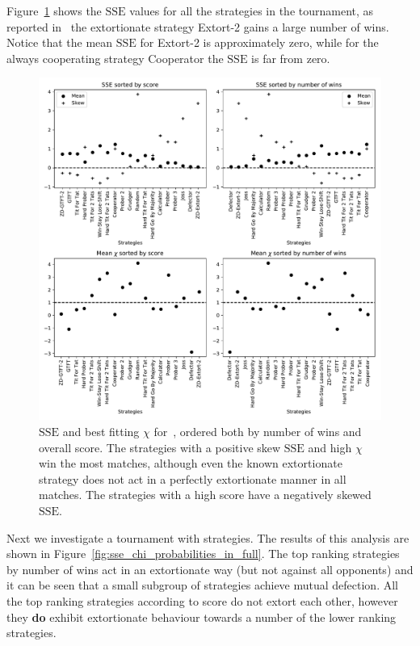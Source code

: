 \documentclass[a4paper]{article}
\newcommand{\SSe}{\text{SSE}}
\begin{document}
Figure~\ref{fig:sserror_in_stewart_plotkin} shows the
\(\SSe\) values for all the strategies in the tournament, as
reported in~\cite{Stewart2012} the extortionate strategy Extort-2 gains a large number of
wins. Notice that the mean \(\SSe\) for Extort-2 is approximately zero, while for
the always cooperating strategy Cooperator the \(\SSe\) is far from zero.

\begin{figure}[!htbp]
    \centering
    \includegraphics[width=.8\textwidth]{./assets/img/sserror_in_stewart_plotkin/main.pdf}
    \caption{\(\SSe\) and best fitting \(\chi\) for~\cite{Stewart2012},
        ordered both by number of wins and overall score.
        The strategies with a positive skew
        \(\SSe\) and high \(\chi\) win the most matches, although even the known
        extortionate strategy does not act in a perfectly extortionate manner in
        all matches. The strategies with a high score have a negatively skewed
        \(\SSe\).
        }
    \label{fig:sserror_in_stewart_plotkin}
\end{figure}

Next we investigate a tournament with
strategies. The results of
this analysis are shown in Figure~\ref{fig:sse_chi_probabilities_in_full}. The
top ranking strategies by number of wins act in an extortionate way (but not
against all opponents) and it can be seen that a small subgroup of strategies
achieve mutual defection.  All the top ranking strategies according to score
do not extort each other, however they
\textbf{do} exhibit extortionate behaviour towards a number of the lower ranking
strategies.
\end{document}
